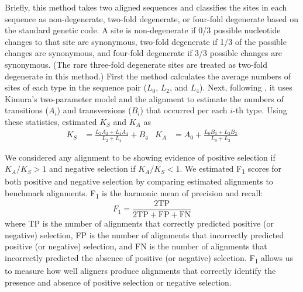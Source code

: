 \documentclass[12pt,letterpaper]{article}
\begin{document}
Briefly, this method takes two aligned sequences and classifies the sites in each sequence as non-degenerate, two-fold degenerate, or four-fold degenerate based on the standard genetic code. A site is non-degenerate if 0/3 possible nucleotide changes to that site are synonymous, two-fold degenerate if 1/3 of the possible changes are synonymous, and four-fold degenerate if 3/3 possible changes are synonymous. (The rare three-fold degenerate sites are treated as two-fold degenerate in this method.) First the method calculates the average numbers of sites of each type in the sequence pair ($L_0$, $L_2$, and $L_4$). Next, following \cite{Li1985}, it uses Kimura's two-parameter model \citep{kimura1980simple} and the alignment to estimate the numbers of transitions ($A_i$) and transversions ($B_i$) that occurred per each $i$-th type. Using these statistics, \cite{ka_ks_li_1993} estimated $K_S$ and $K_A$ as
\begin{align*}
K_S &= \frac{L_2 A_2 + L_4 A_4}{L_2 + L_4} + B_4 &
K_A &= A_0 + \frac{L_0 B_0 + L_2 B_2}{L_0 + L_2}
\end{align*}

We considered any alignment to be showing evidence of positive selection if $K_A/K_S > 1$ and negative selection if $K_A/K_S < 1$. We estimated F\textsubscript{1} scores for both positive and negative selection by comparing estimated alignments to benchmark alignments. F\textsubscript{1} is the harmonic mean of precision and recall:
\[
F_1 = \frac{2 \text{TP}}{2 \text{TP} + \text{FP} + \text{FN}}
\]
where TP is the number of alignments that correctly predicted positive (or negative) selection, FP is the number of alignments that incorrectly predicted positive (or negative) selection, and FN is the number of alignments that incorrectly predicted the absence of positive (or negative) selection. F\textsubscript{1} allows us to measure how well aligners produce alignments that correctly identify the presence and absence of positive selection or negative selection.
\end{document}
